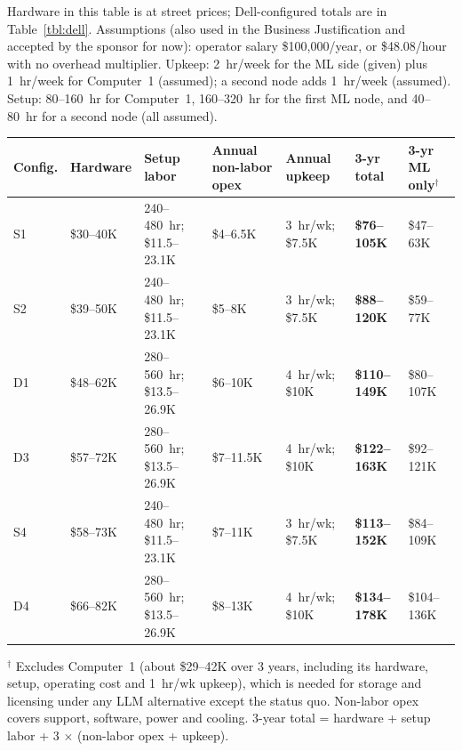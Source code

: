 

Hardware in this table is at street prices; Dell-configured totals are in
Table~\ref{tbl:dell}. Assumptions (also used in the Business Justification and accepted by
the sponsor for now): operator salary
\$100,000/year, or \$48.08/hour with no overhead multiplier. Upkeep: 2~hr/week
for the ML side (given) plus 1~hr/week for Computer~1 (assumed); a second node
adds 1~hr/week (assumed). Setup: 80--160~hr for Computer~1, 160--320~hr for the
first ML node, and 40--80~hr for a second node (all assumed).

{\scriptsize
\begin{xltabular}{\textwidth}{@{}l Y{0.891} Y{1.366} Y{0.891} Y{0.95} Y{0.95} Y{0.952}@{}}
  \toprule
  Config. & Hardware & Setup labor & Annual non-labor opex & Annual upkeep & \textbf{3-yr total} & 3-yr ML only$^\dagger$ \\
  \midrule
  \endhead
  S1 & \$30--40K & 240--480~hr; \$11.5--23.1K & \$4--6.5K & 3~hr/wk; \$7.5K & \textbf{\$76--105K} & \$47--63K \\
  S2 & \$39--50K & 240--480~hr; \$11.5--23.1K & \$5--8K & 3~hr/wk; \$7.5K & \textbf{\$88--120K} & \$59--77K \\
  D1 & \$48--62K & 280--560~hr; \$13.5--26.9K & \$6--10K & 4~hr/wk; \$10K & \textbf{\$110--149K} & \$80--107K \\
  D3 & \$57--72K & 280--560~hr; \$13.5--26.9K & \$7--11.5K & 4~hr/wk; \$10K & \textbf{\$122--163K} & \$92--121K \\
  S4 & \$58--73K & 240--480~hr; \$11.5--23.1K & \$7--11K & 3~hr/wk; \$7.5K & \textbf{\$113--152K} & \$84--109K \\
  D4 & \$66--82K & 280--560~hr; \$13.5--26.9K & \$8--13K & 4~hr/wk; \$10K & \textbf{\$134--178K} & \$104--136K \\
  \bottomrule
\end{xltabular}}
{\footnotesize $^\dagger$ Excludes Computer~1 (about \$29--42K over 3 years, including its hardware, setup, operating cost and 1~hr/wk upkeep), which is needed for storage and licensing under any LLM alternative except the status quo. Non-labor opex covers support, software, power and cooling. 3-year total = hardware + setup labor + 3 $\times$ (non-labor opex + upkeep).}

